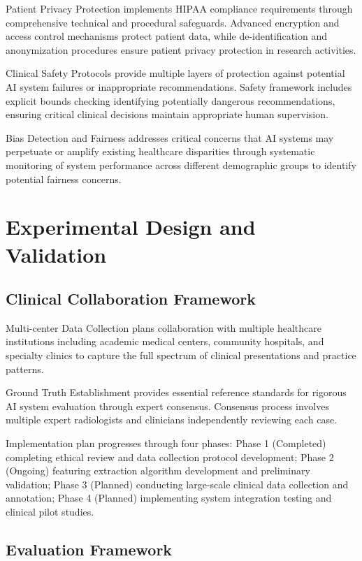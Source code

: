 Patient Privacy Protection implements HIPAA compliance requirements through comprehensive technical and procedural safeguards. Advanced encryption and access control mechanisms protect patient data, while de-identification and anonymization procedures ensure patient privacy protection in research activities.

Clinical Safety Protocols provide multiple layers of protection against potential AI system failures or inappropriate recommendations. Safety framework includes explicit bounds checking identifying potentially dangerous recommendations, ensuring critical clinical decisions maintain appropriate human supervision.

Bias Detection and Fairness addresses critical concerns that AI systems may perpetuate or amplify existing healthcare disparities through systematic monitoring of system performance across different demographic groups to identify potential fairness concerns.

\section{Experimental Design and Validation}

\subsection{Clinical Collaboration Framework}

Multi-center Data Collection plans collaboration with multiple healthcare institutions including academic medical centers, community hospitals, and specialty clinics to capture the full spectrum of clinical presentations and practice patterns.

Ground Truth Establishment provides essential reference standards for rigorous AI system evaluation through expert consensus. Consensus process involves multiple expert radiologists and clinicians independently reviewing each case.

Implementation plan progresses through four phases: Phase 1 (Completed) completing ethical review and data collection protocol development; Phase 2 (Ongoing) featuring extraction algorithm development and preliminary validation; Phase 3 (Planned) conducting large-scale clinical data collection and annotation; Phase 4 (Planned) implementing system integration testing and clinical pilot studies.

\subsection{Evaluation Framework}

